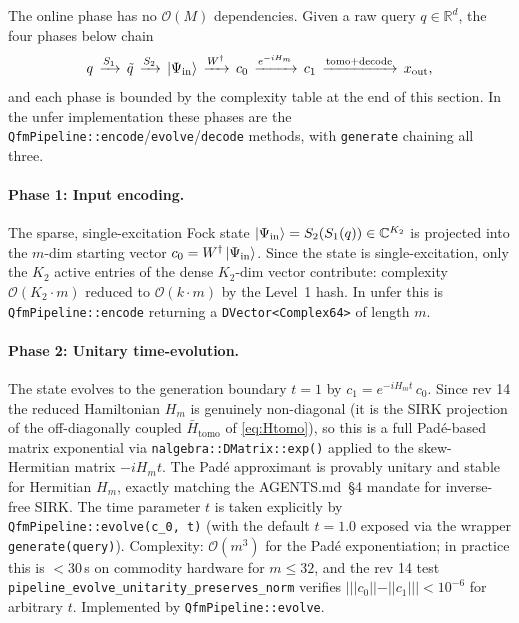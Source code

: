 \documentclass[11pt, a4paper]{article}
\newcommand{\Rset}{\mathbb{R}}
\newcommand{\Cset}{\mathbb{C}}
\begin{document}
The online phase has no $\mathcal{O}(M)$ dependencies. Given a raw query
$q\in\Rset^d$, the four phases below chain
\begin{equation}
  q\,\xrightarrow{S_1}\,\tilde q\,\xrightarrow{S_2}\,\ket{\Psi_{\mathrm{in}}}\,\xrightarrow{W^\dagger}\,c_0\,\xrightarrow{e^{-iH_m}}\,c_1\,\xrightarrow{\mathrm{tomo+decode}}\,x_{\mathrm{out}},
\end{equation}
and each phase is bounded by the complexity table at the end of this section.
In the unfer implementation these phases are the
\texttt{QfmPipeline::encode}/\texttt{evolve}/\texttt{decode} methods, with
\texttt{generate} chaining all three.

\paragraph{Phase 1: Input encoding.} The sparse, single-excitation Fock state
$\ket{\Psi_{\mathrm{in}}}=S_2(S_1(q))\in\Cset^{K_2}$ is projected into the
$m$-dim starting vector $c_0=W^\dagger\ket{\Psi_{\mathrm{in}}}$. Since the
state is single-excitation, only the $K_2$ active entries of the dense
$K_2$-dim vector contribute: complexity $\mathcal{O}(K_2\cdot m)$ reduced to
$\mathcal{O}(k\cdot m)$ by the Level~1 hash. In unfer this is
\texttt{QfmPipeline::encode} returning a \texttt{DVector<Complex64>} of
length $m$.

\paragraph{Phase 2: Unitary time-evolution.} The state evolves to the
generation boundary $t=1$ by $c_1=e^{-iH_m t}\,c_0$. Since rev 14 the
reduced Hamiltonian $H_m$ is genuinely non-diagonal (it is the SIRK
projection of the off-diagonally coupled $\bar H_{\mathrm{tomo}}$ of
\eqref{eq:Htomo}), so this is a full Pad\'e-based matrix exponential via
\texttt{nalgebra::DMatrix::exp()} applied to the skew-Hermitian matrix
$-i H_m t$. The Pad\'e approximant is provably unitary and stable for
Hermitian $H_m$, exactly matching the AGENTS.md~\S4 mandate for
inverse-free SIRK. The time parameter $t$ is taken explicitly by
\texttt{QfmPipeline::evolve(c\_0, t)} (with the default $t=1.0$ exposed
via the wrapper \texttt{generate(query)}). Complexity:
$\mathcal{O}(m^3)$ for the Pad\'e exponentiation; in practice this is
$<$30\,\textmu s on commodity hardware for $m\leq 32$, and the rev 14
test \texttt{pipeline\_evolve\_unitarity\_preserves\_norm} verifies
$|||c_0||-||c_1||| < 10^{-6}$ for arbitrary $t$. Implemented by
\texttt{QfmPipeline::evolve}.
\end{document}
